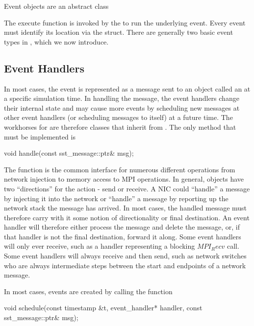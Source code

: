 Event objects are an abstract class

\begin{CppCode}
namespace sstmac {

class event
{
 public:
  virtual void
  execute() = 0;

  virtual event_loc_id
  event_location() const = 0;
};
\end{CppCode}

The execute function is invoked by the \evmgr to run the underlying event.
Every event must identify its location via the  struct.
There are generally two basic event types in \sstmacro, which we now introduce.

\subsection{Event Handlers}
In most cases, the event is represented as a message sent to an object called an \evhandler at a specific simulation time.
In handling the message, the event handlers change their internal state and may cause more events
by scheduling new messages at other event handlers (or scheduling messages to itself) at a future time.
The workhorses for \sstmacro are therefore classes that inherit from \evhandler.
The only method that must be implemented is

\begin{CppCode}
void
handle(const sst_message::ptr& msg);
\end{CppCode}
The function is the common interface for numerous different operations from network injection to memory access to MPI operations.
In general, objects have two ``directions'' for the action - send or receive.
A NIC could ``handle'' a message by injecting it into the network or ``handle'' a message by reporting up the network stack the message has arrived.
In most cases, the handled message must therefore carry with it some notion of directionality or final destination.
An event handler will therefore either process the message and delete the message, or, if that handler is not the final destination, forward it along.
Some event handlers will only ever receive, such as a handler representing a blocking $MPI_Recv$ call.
Some event handlers will always receive and then send, such as network switches who are always intermediate steps between the start and endpoints of a network message.

In most cases, events are created by calling the function

\begin{CppCode}
void
schedule(const timestamp &t,
  event_handler* handler,
  const sst_message::ptr& msg);
\end{CppCode}

